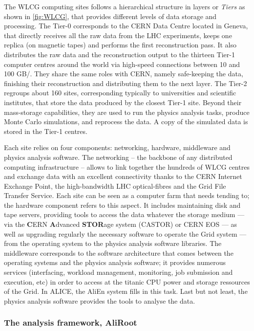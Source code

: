 The WLCG computing sites follows a hierarchical structure in layers or \textit{Tiers} as shown in \fig\ref{fig:WLCG}, that provides different levels of data storage and processing. The Tier-0 corresponds to the CERN Data Centre located in Geneva, that directly receives all the raw data from the LHC experiments, keeps one replica (on magnetic tapes) and performs the first reconstruction pass. It also distributes the raw data and the reconstruction output to the thirteen Tier-1 computer centres around the world via high-speed connections between 10 and 100 GB/\second. They share the same roles with CERN, namely safe-keeping the data, finishing their reconstruction and distributing them to the next layer. The Tier-2 regroups about 160 sites, corresponding typically to universities and scientific institutes, that store the data produced by the closest Tier-1 site. Beyond their mass-storage capabilities, they are used to run the physics analysis tasks, produce Monte Carlo simulations, and reprocess the data. A copy of the simulated data is stored in the Tier-1 centres.

Each site relies on four components: networking, hardware, middleware and physics analysis software. The networking -- the backbone of any distributed computing infrastructure -- allows to link together the hundreds of WLCG centres and exchange data with an excellent connectivity thanks to the CERN Internet Exchange Point, the high-bandwidth LHC optical-fibres and the Grid File Transfer Service. Each site can be seen as a computer farm that needs tending to; the hardware component refers to this aspect. It includes maintaining disk and tape servers, providing tools to access the data whatever the storage medium --- via the \textbf{C}ERN \textbf{A}dvanced \textbf{STOR}age system (CASTOR) or CERN EOS --- as well as upgrading regularly the necessary software to operate the Grid system --- from the operating system to the physics analysis software libraries. The middleware corresponds to the software architecture that comes between the operating systems and the physics analysis software; it provides numerous services (interfacing, workload management, monitoring, job submission and execution, etc) in order to access at the titanic CPU power and storage ressources of the Grid. In ALICE, the AliEn system fills in this task. Last but not least, the physics analysis software provides the tools to analyse the data.


\subsubsection{The analysis framework, AliRoot}
\label{subsubsec:AliRoot}

